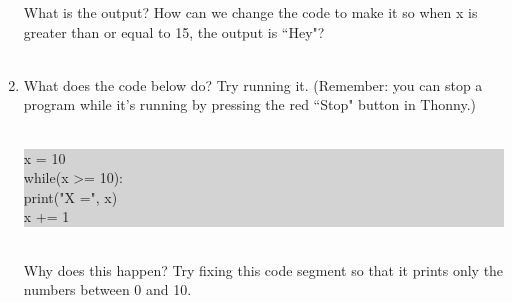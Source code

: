 \documentclass[11pt, letterpaper, onecolumn, oneside, final]{article}
\begin{document}
\begin{enumerate}
What is the output? How can we change the code to make it so when {\consolas x} is greater than or equal to 15, the output is \textquotedblleft Hey"?\\\\

\item 
    What does the code below do? Try running it. (Remember: you can stop a program while it's running by pressing the red \textquotedblleft Stop" button in 
    Thonny.) \\ \\
    \colorbox{lightgray}{\parbox{.88\textwidth}{\consolas x = 10 \\ while(x >= 10): \\ 
    \hspace*{6mm} print("X =", x) \\ \hspace*{6mm} x += 1}} \\ 


    Why does this happen? Try fixing this code segment so that it prints only the numbers between 0 and 10.\\\\\\\\\\


\end{enumerate}
\end{document}

